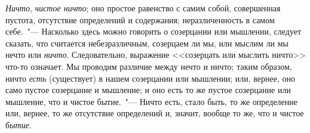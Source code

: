 \emph{Ничто}, \emph{чистое ничто}; оно простое равенство с самим
собой, совершенная пустота, отсутствие определений и
содержания; неразличенность в самом себе.~"--- Насколько
здесь можно говорить о созерцании или мышлении, следует
сказать, что считается небезразличным, созерцаем
ли мы, или мыслим ли мы нечто или \emph{ничто}. Следовательно,
выражение <<созерцать или мыслить ничто>> что-то
означает. Мы проводим различие между нечто и ничто;
таким образом, ничто \emph{есть} (существует) в нашем созерцании
или мышлении; или, вернее, оно само пустое созерцание
и мышление; и оно есть то же пустое созерцание
или мышление, что и чистое бытие.~"--- Ничто есть,
стало быть, то же определение или, вернее, то же отсутствие
определений и, значит, вообще то же, что и чистое
\emph{бытие}.

